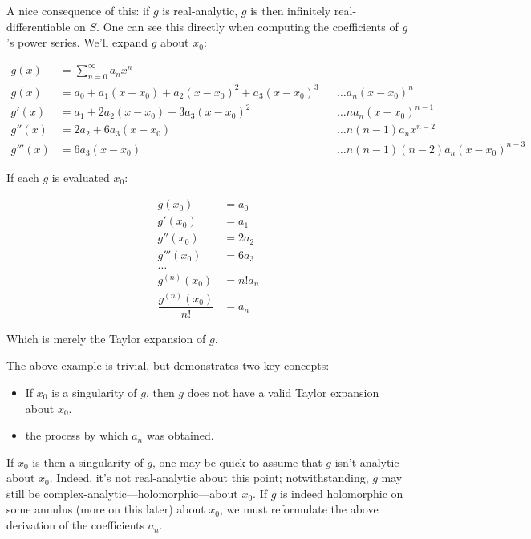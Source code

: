 \documentclass[12pt,a4paper]{report}
\theoremstyle{thms}
\theoremstyle{defns}
\begin{document}
A nice consequence of this: if $g$ is real-analytic, $g$ is then infinitely real-differentiable on $S$. One can see this directly when computing the coefficients of $g$'s power series. We'll expand $g$ about $x_0$:

\begin{align}
    g(x)    & = \sum_{n=0}^{\infty} a_nx^n                                                            \\
    g(x)    & = a_0 + a_1(x-x_0) + a_2(x-x_0)^2 + a_3(x-x_0)^3 &  & \dots a_n(x-x_0)^n                \\
    g'(x)   & = a_1 + 2a_2(x-x_0) + 3a_3(x-x_0)^2              &  & \dots na_n(x-x_0)^{n-1}           \\
    g''(x)  & = 2a_2 + 6a_3(x-x_0)                             &  & \dots n(n-1)a_nx^{n-2}            \\
    g'''(x) & = 6a_3(x-x_0)                                    &  & \dots n(n-1)(n-2)a_n(x-x_0)^{n-3}
\end{align}

If each $g$ is evaluated $x_0$:

\begin{align}
    g(x_0)                   & = a_0   \\
    g'(x_0)                  & = a_1   \\
    g''(x_0)                 & = 2a_2  \\
    g'''(x_0)                & = 6a_3  \\
    \dots                              \\
    g^{(n)}(x_0)             & = n!a_n \\
    \dfrac{g^{(n)}(x_0)}{n!} & = a_n
    \label{eq:taylord}
\end{align}

Which is merely the Taylor expansion of $g$.

The above example is trivial, but demonstrates two key concepts:

\begin{itemize}
    \item If $x_0$ is a singularity of $g$, then $g$ does not have a valid Taylor expansion about $x_0$.
    \item the process by which $a_n$ was obtained.
\end{itemize}

If $x_0$ is then a singularity of $g$, one may be quick to assume that $g$ isn't analytic about $x_0$. Indeed, it's not real-analytic about this point; notwithstanding, $g$ may still be complex-analytic—holomorphic—about $x_0$. If $g$ is indeed holomorphic on some annulus (more on this later) about $x_0$, we must reformulate the above derivation of the coefficients $a_n$.
\end{document}
